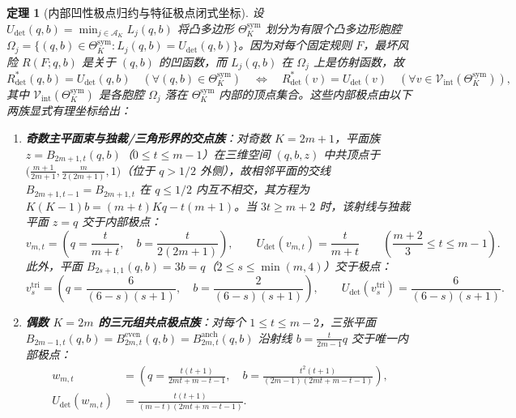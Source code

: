 \documentclass[11pt,a4paper]{article}
\newtheorem{theorem}{定理}[section]
\theoremstyle{definition}
\theoremstyle{remark}
\newcommand{\Rdet}{R^*_{\mathrm{det}}}
\newcommand{\Thetasym}{\Theta^{\mathrm{sym}}_K}
\begin{document}
\begin{theorem}[内部凹性极点归约与特征极点闭式坐标]\label{thm:vertices}
设 $U_{\mathrm{det}}(q, b) = \min_{j \in \mathcal{A}_K} L_j(q, b)$ 将凸多边形 $\Thetasym$ 划分为有限个凸多边形胞腔 $\Omega_j = \{(q,b) \in \Thetasym : L_j(q,b) = U_{\mathrm{det}}(q,b)\}$。因为对每个固定规则 $F$，最坏风险 $R(F; q, b)$ 是关于 $(q, b)$ 的凹函数，而 $L_j(q, b)$ 在 $\Omega_j$ 上是仿射函数，故
\begin{equation}\label{eq:vertex_reduction}
  \Rdet(q, b) = U_{\mathrm{det}}(q, b)\quad (\forall (q, b) \in \Thetasym) \quad\Longleftrightarrow\quad \Rdet(v) = U_{\mathrm{det}}(v)\quad (\forall v \in \mathcal{V}_{\mathrm{int}}(\Thetasym)),
\end{equation}
其中 $\mathcal{V}_{\mathrm{int}}(\Thetasym)$ 是各胞腔 $\Omega_j$ 落在 $\Thetasym$ 内部的顶点集合。这些内部极点由以下两族显式有理坐标给出：
\begin{enumerate}
  \setlength{\itemsep}{2pt}\setlength{\parskip}{0pt}
  \item \textbf{奇数主平面束与独裁/三角形界的交点族}：对奇数 $K = 2m+1$，平面族 $z = B_{2m+1, t}(q, b)$（$0 \le t \le m-1$）在三维空间 $(q, b, z)$ 中共顶点于 $\bigl(\frac{m+1}{2m+1}, \frac{m}{2(2m+1)}, 1\bigr)$（位于 $q > 1/2$ 外侧），故相邻平面的交线 $B_{2m+1, t-1} = B_{2m+1, t}$ 在 $q \le 1/2$ 内互不相交，其方程为 $K(K-1)b = (m+t)Kq - t(m+1)$。当 $3t \ge m + 2$ 时，该射线与独裁平面 $z = q$ 交于内部极点：
  \begin{equation}\label{eq:v_t_odd}
    \boxed{v_{m, t} = \left( q = \frac{t}{m + t},\quad b = \frac{t}{2(2m + 1)} \right), \qquad U_{\mathrm{det}}(v_{m, t}) = \frac{t}{m + t} \qquad \left(\frac{m+2}{3} \le t \le m - 1\right).}
  \end{equation}
  此外，平面 $B_{2s+1, 1}(q, b) = 3b = q$（$2 \le s \le \min(m, 4)$）交于极点：
  \begin{equation}\label{eq:v_1_odd}
    \boxed{v^{\mathrm{tri}}_s = \left( q = \frac{6}{(6 - s)(s + 1)},\quad b = \frac{2}{(6 - s)(s + 1)} \right), \qquad U_{\mathrm{det}}(v^{\mathrm{tri}}_s) = \frac{6}{(6 - s)(s + 1)}.}
  \end{equation}
  \item \textbf{偶数 $K = 2m$ 的三元组共点极点族}：对每个 $1 \le t \le m - 2$，三张平面 $B_{2m-1, t}(q, b) = B^{\mathrm{even}}_{2m, t}(q, b) = B^{\mathrm{anch}}_{2m, t}(q, b)$ 沿射线 $b = \frac{t}{2m-1}q$ 交于唯一内部极点：
  \begin{equation}\label{eq:w_mt_even}
    \boxed{\begin{aligned}
      w_{m, t} &= \left( q = \frac{t(t + 1)}{2mt + m - t - 1},\quad b = \frac{t^2(t + 1)}{(2m - 1)(2mt + m - t - 1)} \right), \\
      U_{\mathrm{det}}(w_{m, t}) &= \frac{t(t + 1)}{(m - t)(2mt + m - t - 1)}.
    \end{aligned}}
  \end{equation}
\end{enumerate}
\end{theorem}
\end{document}
